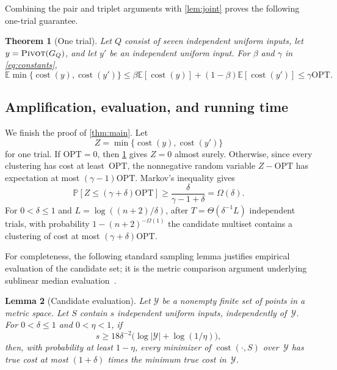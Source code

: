 \documentclass[11pt,letterpaper]{article}
\newtheorem{theorem}{Theorem}[section]
\newtheorem{lemma}[theorem]{Lemma}
\theoremstyle{definition}
\theoremstyle{remark}
\newcommand{\OPT}{\mathrm{OPT}}
\newcommand{\cost}{\operatorname{cost}}
\newcommand{\E}{\mathbb{E}}
\newcommand{\Prb}{\mathbb{P}}
\newcommand{\1}{\mathbf{1}}
\newcommand{\Pivot}{\textnormal{\textsc{Pivot}}}
\begin{document}
Combining the pair and triplet arguments with \cref{lem:joint} proves the following one-trial guarantee.

\begin{theorem}[One trial]\label{thm:one-trial}
Let $Q$ consist of seven independent uniform inputs, let $y=\Pivot(G_Q)$, and let $y'$ be an independent uniform input.  For $\beta$ and $\gamma$ in \cref{eq:constants},
\[
 \E\min\{\cost(y),\cost(y')\}
 \le \beta\E[\cost(y)]+(1-\beta)\E[\cost(y')]
 \le \gamma\OPT.
\]
\end{theorem}

\subsection{Amplification, evaluation, and running time}

We finish the proof of \cref{thm:main}.  Let
\[
 Z=\min\{\cost(y),\cost(y')\}
\]
for one trial.  If $\OPT=0$, then \cref{thm:one-trial} gives $Z=0$ almost surely.  Otherwise, since every clustering has cost at least~$\OPT$, the nonnegative random variable $Z-\OPT$ has expectation at most $(\gamma-1)\OPT$.  Markov's inequality gives
\begin{equation}\label{eq:success-prob}
 \Prb[Z\le(\gamma+\delta)\OPT]
 \ge \frac{\delta}{\gamma-1+\delta}
 =\Omega(\delta).
\end{equation}
For $0<\delta\le1$ and $L=\log((n+2)/\delta)$, after $T=\Theta(\delta^{-1}L)$ independent trials, with probability $1-(n+2)^{-\Omega(1)}$ the candidate multiset contains a clustering of cost at most $(\gamma+\delta)\OPT$.

For completeness, the following standard sampling lemma justifies empirical evaluation of the candidate set; it is the metric comparison argument underlying sublinear median evaluation~\cite{indyk,carmel-das-nguyen}.

\begin{lemma}[Candidate evaluation]\label{lem:evaluation}
Let $\mathcal Y$ be a nonempty finite set of points in a metric space.  Let $S$ contain $s$ independent uniform inputs, independently of~$\mathcal Y$.  For $0<\delta\le1$ and $0<\eta<1$, if
\[
 s\ge18\delta^{-2}\bigl(\log|\mathcal Y|+\log(1/\eta)\bigr),
\]
then, with probability at least $1-\eta$, every minimizer of $\cost(\cdot,S)$ over~$\mathcal Y$ has true cost at most $(1+\delta)$ times the minimum true cost in~$\mathcal Y$.
\end{lemma}
\end{document}
